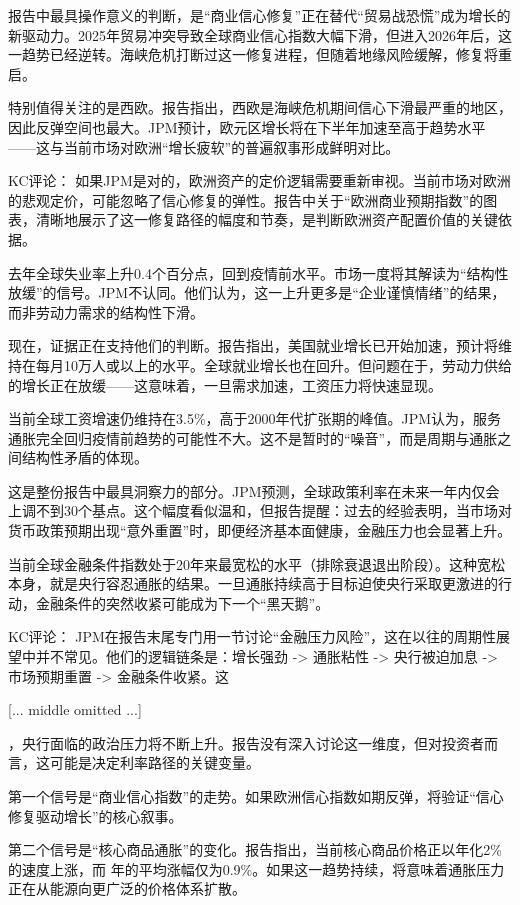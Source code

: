 \documentclass[11pt]{ctexart}
\begin{document}
报告中最具操作意义的判断，是“商业信心修复”正在替代“贸易战恐慌”成为增长的新驱动力。2025年贸易冲突导致全球商业信心指数大幅下滑，但进入2026年后，这一趋势已经逆转。海峡危机打断过这一修复进程，但随着地缘风险缓解，修复将重启。

特别值得关注的是西欧。报告指出，西欧是海峡危机期间信心下滑最严重的地区，因此反弹空间也最大。JPM预计，欧元区增长将在下半年加速至高于趋势水平——这与当前市场对欧洲“增长疲软”的普遍叙事形成鲜明对比。

KC评论： 如果JPM是对的，欧洲资产的定价逻辑需要重新审视。当前市场对欧洲的悲观定价，可能忽略了信心修复的弹性。报告中关于“欧洲商业预期指数”的图表，清晰地展示了这一修复路径的幅度和节奏，是判断欧洲资产配置价值的关键依据。

去年全球失业率上升0.4个百分点，回到疫情前水平。市场一度将其解读为“结构性放缓”的信号。JPM不认同。他们认为，这一上升更多是“企业谨慎情绪”的结果，而非劳动力需求的结构性下滑。

现在，证据正在支持他们的判断。报告指出，美国就业增长已开始加速，预计将维持在每月10万人或以上的水平。全球就业增长也在回升。但问题在于，劳动力供给的增长正在放缓——这意味着，一旦需求加速，工资压力将快速显现。

当前全球工资增速仍维持在3.5\%，高于2000年代扩张期的峰值。JPM认为，服务通胀完全回归疫情前趋势的可能性不大。这不是暂时的“噪音”，而是周期与通胀之间结构性矛盾的体现。

这是整份报告中最具洞察力的部分。JPM预测，全球政策利率在未来一年内仅会上调不到30个基点。这个幅度看似温和，但报告提醒：过去的经验表明，当市场对货币政策预期出现“意外重置”时，即便经济基本面健康，金融压力也会显著上升。

当前全球金融条件指数处于20年来最宽松的水平（排除衰退退出阶段）。这种宽松本身，就是央行容忍通胀的结果。一旦通胀持续高于目标迫使央行采取更激进的行动，金融条件的突然收紧可能成为下一个“黑天鹅”。

KC评论： JPM在报告末尾专门用一节讨论“金融压力风险”，这在以往的周期性展望中并不常见。他们的逻辑链条是：增长强劲 -> 通胀粘性 -> 央行被迫加息 -> 市场预期重置 -> 金融条件收紧。这

[... middle omitted ...]

，央行面临的政治压力将不断上升。报告没有深入讨论这一维度，但对投资者而言，这可能是决定利率路径的关键变量。

第一个信号是“商业信心指数”的走势。如果欧洲信心指数如期反弹，将验证“信心修复驱动增长”的核心叙事。

第二个信号是“核心商品通胀”的变化。报告指出，当前核心商品价格正以年化2\%的速度上涨，而 年的平均涨幅仅为0.9\%。如果这一趋势持续，将意味着通胀压力正在从能源向更广泛的价格体系扩散。
\end{document}
